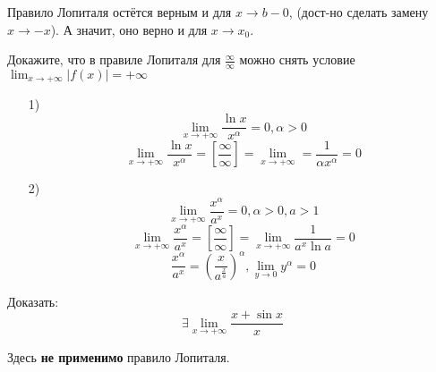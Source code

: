 \begin{note}
Правило Лопиталя остётся верным и для $x \rightarrow b - 0$, (дост-но сделать замену $x \rightarrow -x$). А значит, оно верно и для $x \rightarrow x_0$.
\end{note}
\begin{task}
Докажите, что в правиле Лопиталя для $\frac{\infty}{\infty}$ можно снять условие $\lim_{x\to +\infty} \left|f(x)\right| = +\infty$
\end{task}
\begin{example}
  \begin{itemize}
    \item [1) ]
\[
\lim_{x\to +\infty} \frac{\ln x}{x^{\alpha}} = 0, \alpha > 0
\]
\[
\lim_{x\to +\infty} \frac{\ln x}{x^{\alpha}} = \left[\frac{\infty}{\infty}\right] = \lim_{x\to +\infty} = \frac{1}{\alpha x^{\alpha}} = 0
\]
\item [2) ] \[
\lim_{x\to+\infty} \frac{x^{\alpha}}{a^{x}} = 0, \alpha > 0, a > 1
\]
\[
 \lim_{x\to+\infty} \frac{x^{\alpha}}{a^{x}} = \left[\frac{\infty}{\infty}\right] = \lim_{x\to +\infty} \frac{1}{a^{x} \ln a} = 0
\]
\[
  \frac{x^{\alpha}}{a^{x}} = \left(\frac{x}{a^{\frac{x}{a}}}\right)^{\alpha}, \lim_{y\to 0} y^{\alpha} = 0
\]
  \end{itemize}
\end{example}
\begin{task}
  Доказать:
\[
\exists \lim_{x\to +\infty} \frac{x + \sin x}{x}
\]
\begin{note}
Здесь \textbf{не применимо} правило Лопиталя.
\end{note}
\end{task}

